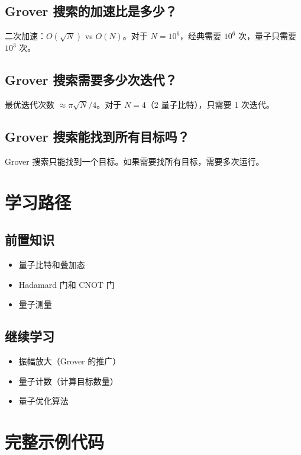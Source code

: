 \documentclass[12pt,a4paper]{article}
\begin{document}
\subsection{Grover 搜索的加速比是多少？}

二次加速：$O(\sqrt{N})$ vs $O(N)$。对于 $N=10^6$，经典需要 $10^6$ 次，量子只需要 $10^3$ 次。

\subsection{Grover 搜索需要多少次迭代？}

最优迭代次数 $\approx \pi\sqrt{N}/4$。对于 $N=4$（2 量子比特），只需要 1 次迭代。

\subsection{Grover 搜索能找到所有目标吗？}

Grover 搜索只能找到一个目标。如果需要找所有目标，需要多次运行。

\section{学习路径}

\subsection{前置知识}
\begin{itemize}
  \item 量子比特和叠加态
  \item Hadamard 门和 CNOT 门
  \item 量子测量
\end{itemize}

\subsection{继续学习}
\begin{itemize}
  \item 振幅放大（Grover 的推广）
  \item 量子计数（计算目标数量）
  \item 量子优化算法
\end{itemize}

\section{完整示例代码}
\end{document}
